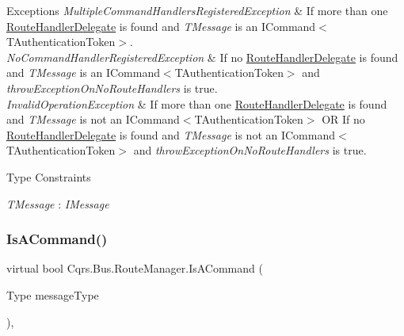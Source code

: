 \begin{DoxyExceptions}{Exceptions}
{\em Multiple\+Command\+Handlers\+Registered\+Exception} & If more than one \hyperlink{classCqrs_1_1Bus_1_1RouteHandlerDelegate}{Route\+Handler\+Delegate} is found and {\itshape T\+Message}  is an I\+Command$<$\+T\+Authentication\+Token$>$.\\
\hline
{\em No\+Command\+Handler\+Registered\+Exception} & If no \hyperlink{classCqrs_1_1Bus_1_1RouteHandlerDelegate}{Route\+Handler\+Delegate} is found and {\itshape T\+Message}  is an I\+Command$<$\+T\+Authentication\+Token$>$ and {\itshape throw\+Exception\+On\+No\+Route\+Handlers}  is true.\\
\hline
{\em Invalid\+Operation\+Exception} & If more than one \hyperlink{classCqrs_1_1Bus_1_1RouteHandlerDelegate}{Route\+Handler\+Delegate} is found and {\itshape T\+Message}  is not an I\+Command$<$\+T\+Authentication\+Token$>$ OR If no \hyperlink{classCqrs_1_1Bus_1_1RouteHandlerDelegate}{Route\+Handler\+Delegate} is found and {\itshape T\+Message}  is not an I\+Command$<$\+T\+Authentication\+Token$>$ and {\itshape throw\+Exception\+On\+No\+Route\+Handlers}  is true.\\
\hline
\end{DoxyExceptions}
\begin{Desc}
\item[Type Constraints]\begin{description}
\item[{\em T\+Message} : {\em I\+Message}]\end{description}
\end{Desc}
\mbox{\label{classCqrs_1_1Bus_1_1RouteManager_a7b7bfc4db30cc5956c4acd6a342e9159_a7b7bfc4db30cc5956c4acd6a342e9159}} 
\subsubsection{\texorpdfstring{Is\+A\+Command()}{IsACommand()}}
{\footnotesize\ttfamily virtual bool Cqrs.\+Bus.\+Route\+Manager.\+Is\+A\+Command (\begin{DoxyParamCaption}\item[{Type}]{message\+Type }\end{DoxyParamCaption})\hspace{0.3cm}{\ttfamily [protected]}, {\ttfamily [virtual]}}



